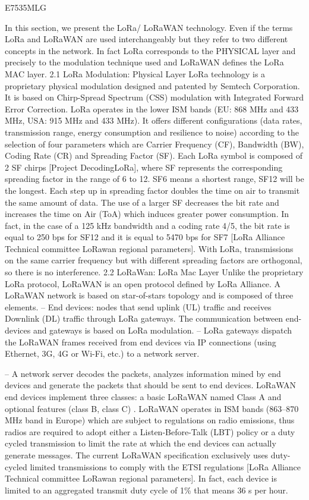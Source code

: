 \cite{montavont_enhanced_2018}E7535MLG

In this section,
	we present the LoRa/ LoRaWAN technology.
Even if the terms LoRa and LoRaWAN are used interchangeably but they refer to two different concepts in the network.
In fact LoRa corresponds to the PHYSICAL layer and precisely to the modulation technique used and LoRaWAN defines the LoRa MAC layer.
2.1 LoRa Modulation:
	Physical Layer LoRa technology is a proprietary physical modulation designed and patented by Semtech Corporation.
It is based on Chirp-Spread Spectrum (CSS) modulation \cite{springer_spread_2000} with Integrated Forward Error Correction.
LoRa operates in the lower ISM bands (EU: 868 MHz and 433 MHz,
	USA: 915 MHz and 433 MHz).
It offers different configurations (data rates,
	transmission range,
	energy consumption and resilience to noise) according to the selection of four parameters which are Carrier Frequency (CF),
	Bandwidth (BW),
	Coding Rate (CR) and Spreading Factor (SF).
Each LoRa symbol is composed of 2 SF chirps [Project DecodingLoRa],
	where SF represents the corresponding spreading factor in the range of 6 to 12.
SF6 means a shortest range,
	SF12 will be the longest.
Each step up in spreading factor doubles the time on air to transmit the same amount of data.
The use of a larger SF decreases the bit rate and increases the time on Air (ToA) which induces greater power consumption.
In fact,
	in the case of a 125 kHz bandwidth and a coding rate 4/5,
	the bit rate is equal to 250 bps for SF12 and it is equal to 5470 bps for SF7 [LoRa Alliance Technical committee LoRawan regional parameters].
With LoRa,
	transmissions on the same carrier frequency but with different spreading factors are orthogonal,
	so there is no interference.
2.2 LoRaWan:
	LoRa Mac Layer Unlike the proprietary LoRa protocol,
	LoRaWAN is an open protocol defined by LoRa Alliance.
A LoRaWAN network is based on star-of-stars topology and is composed of three elements.
– End devices:
	nodes that send uplink (UL) traffic and receives Downlink (DL) traffic through LoRa gateways.
The communication between end-devices and gateways is based on LoRa modulation.
– LoRa gateways dispatch the LoRaWAN frames received from end devices via IP connections (using Ethernet, 3G, 4G or Wi-Fi,
	etc.) to a network server.

– A network server decodes the packets,
	analyzes information mined by end devices and generate the packets that should be sent to end devices.
LoRaWAN end devices implement three classes:
	a basic LoRaWAN named Class A and optional features (class B,
	class C) \cite{LorawanSpecification}.
LoRaWAN operates in ISM bands (863–870 MHz band in Europe) which are subject to regulations on radio emissions,
	thus radios are required to adopt either a Listen-Before-Talk (LBT) policy or a duty cycled transmission to limit the rate at which the end devices can actually generate messages.
The current LoRaWAN specification exclusively uses duty-cycled limited transmissions to comply with the ETSI regulations [LoRa Alliance Technical committee LoRawan regional parameters].
In fact,
	each device is limited to an aggregated transmit duty cycle of 1\% that means 36 s per hour.

